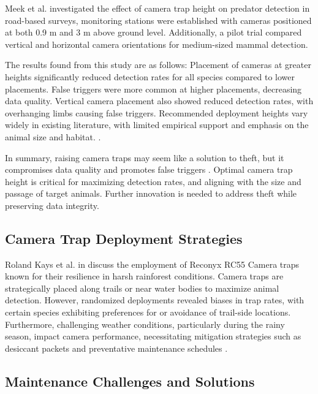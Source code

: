 \documentclass[class=report,11pt,crop=false]{standalone}
\begin{document}
Meek et al. \cite{meek2016higher} investigated the effect of camera trap height on predator detection in road-based surveys, monitoring stations were established with cameras positioned at both 0.9 m and 3 m above ground level. Additionally, a pilot trial compared vertical and horizontal camera orientations for medium-sized mammal detection. 

The results found from this study are as follows: Placement of cameras at greater heights significantly reduced detection rates for all species compared to lower placements. False triggers were more common at higher placements, decreasing data quality. Vertical camera placement also showed reduced detection rates, with overhanging limbs causing false triggers. Recommended deployment heights vary widely in existing literature, with limited empirical support and emphasis on the animal size and habitat. \cite{meek2016higher}. 

In summary, raising camera traps may seem like a solution to theft, but it compromises data quality and promotes false triggers \cite{meek2016higher}. Optimal camera trap height is critical for maximizing detection rates, and aligning with the size and passage of target animals. Further innovation is needed to address theft while preserving data integrity. 

 

\subsection{Camera Trap Deployment Strategies}

Roland Kays et al. in \cite{kays2009camera} discuss the employment of Reconyx RC55 Camera traps known for their resilience in harsh rainforest conditions. Camera traps are strategically placed along trails or near water bodies to maximize animal detection. However, randomized deployments revealed biases in trap rates, with certain species exhibiting preferences for or avoidance of trail-side locations. Furthermore, challenging weather conditions, particularly during the rainy season, impact camera performance, necessitating mitigation strategies such as desiccant packets and preventative maintenance schedules \cite{kays2009camera}.

 

\subsection{Maintenance Challenges and Solutions}
\end{document}
